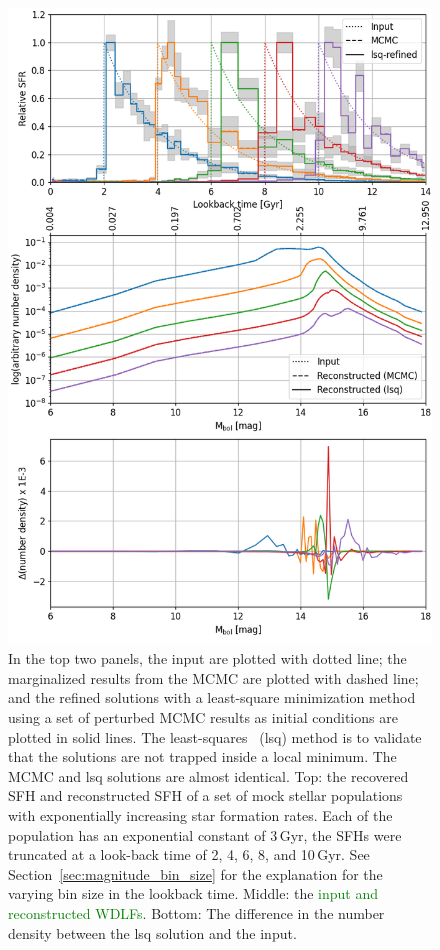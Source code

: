 \documentclass[fleqn,usenatbib]{mnras}
\begin{document}
\begin{figure}
  \includegraphics[width=\columnwidth]{figures/fig_01_exponential_decay_wdlf.png}
  \caption{In the top two panels, the input are plotted with dotted line; the
  marginalized results from the MCMC are plotted with dashed line; and the
  refined solutions with a least-square minimization method using a set of
  perturbed MCMC results as initial conditions are plotted in solid lines.
  The least-squares ~(lsq) method is to validate that the solutions are not
  trapped inside a local minimum. The MCMC and lsq solutions are almost
  identical. Top: the recovered SFH and reconstructed SFH of a set of mock
  stellar populations with exponentially increasing star formation rates. Each
  of the population has an exponential constant of 3\,Gyr, the SFHs were
  truncated at a look-back time of 2, 4, 6, 8, and 10\,Gyr. See 
  Section~\ref{sec:magnitude_bin_size} for the explanation for the varying bin
  size in the lookback time. Middle: the \textcolor{green}{input and reconstructed WDLFs}. Bottom: The difference
  in the number density between the lsq solution and the input.}
  \label{fig:exponential_sfh}
\end{figure}
\end{document}
